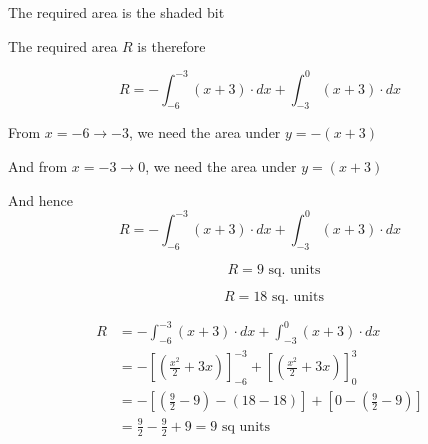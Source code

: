 \documentclass[14pt,fleqn]{extarticle}
\newcommand\inta{\int_{-6}^{-3}}
\newcommand\intb{\int_{-3}^0}
\newcommand\fx{\left(\frac{x^2}{2} + 3x\right)}
\begin{document}
The required area is the shaded bit 

\newcard 

The required area $R$ is therefore 

\[ R = -\inta \left(x+3 \right)\cdot dx + \intb \left(x+3 \right)\cdot dx \]

\newcard 

From $x=-6\rightarrow -3$, we need the area under $y = - \left(x+3 \right)$\newline 

And from $x=-3\rightarrow 0$, we need the area under $y = \left(x+3 \right)$\newline 

And hence 
\[ R = -\inta \left(x+3 \right)\cdot dx + \intb \left(x+3 \right)\cdot dx \]

\newcard 

\[ \qquad R = 9\text{ sq. units} \]

\newcard 

 \[ \qquad R = 18\text{ sq. units} \]
 
 \newcard 
 
 \begin{align}
 R &= -\inta \left(x+3 \right)\cdot dx + \intb \left(x+3 \right)\cdot dx \\
 &= - \left[\fx \right]_{-6}^{-3} + \left[\fx \right]_0^3 \\
 &= -\left[\left(\frac{9}{2}-9\right) - \left(18-18\right) \right] + \left[0-\left(\frac{9}{2}-9\right)\right]\\
 &= \frac{9}{2} - \frac{9}{2} + 9 = 9\text{ sq units}
\end{align}
\end{document}
